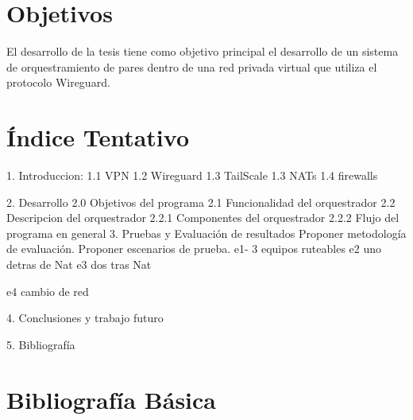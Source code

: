 \documentclass{article}
\begin{document}
\section{Objetivos}

El desarrollo de la tesis tiene como objetivo principal el desarrollo de un sistema de orquestramiento de pares dentro de una red privada virtual que utiliza el protocolo Wireguard.


\section{Índice Tentativo}

1. Introduccion:
    1.1 VPN
    1.2 Wireguard
    1.3 TailScale
    1.3 NATs
    1.4 firewalls

2. Desarrollo
    2.0 Objetivos del programa
    2.1 Funcionalidad del orquestrador
    2.2 Descripcion del orquestrador
    2.2.1 Componentes del orquestrador
    2.2.2 Flujo del programa en general
3. Pruebas y Evaluación de resultados 
Proponer metodología de evaluación.
Proponer escenarios de prueba.
e1- 3 equipos  ruteables
e2 uno detras de Nat
e3 dos tras Nat

e4 cambio de red

4. Conclusiones y trabajo futuro 

5. Bibliografía 
    

\section{Bibliografía Básica}
\end{document}
